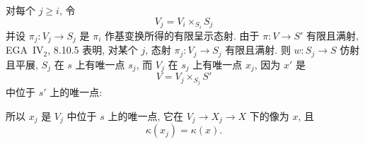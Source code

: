 对每个 \(j\geq i\), 令
\[
  V_j=V_i\times_{S_i}S_j
\]
并设 \(\pi_j:V_j\to S_j\) 是 \(\pi_i\) 作基变换所得的有限呈示态射.
由于 \(\pi:V\to S'\) 有限且满射,
EGA~IV\(_2\), 8.10.5 表明, 对某个 \(j\),
态射 \(\pi_j:V_j\to S_j\) 有限且满射.
则 \(w:S_j\to S\) 仿射且平展,
\(S_j\) 在 \(s\) 上有唯一点 \(s_j\),
而 \(V_j\) 在 \(s_j\) 上有唯一点 \(x_j\),
因为 \(x'\) 是
\[
  V=V_j\times_{S_j}S'
\]
中位于 \(s'\) 上的唯一点:
\begin{center}
  \label{diag:sga3-VIB-5.6.1-final-composite}%
  {\small
  }
\end{center}
所以 \(x_j\) 是 \(V_j\) 中位于 \(s\) 上的唯一点,
它在 \(V_j\to X_j\to X\) 下的像为 \(x\), 且
\[
  \kappa(x_j)=\kappa(x).
\]


